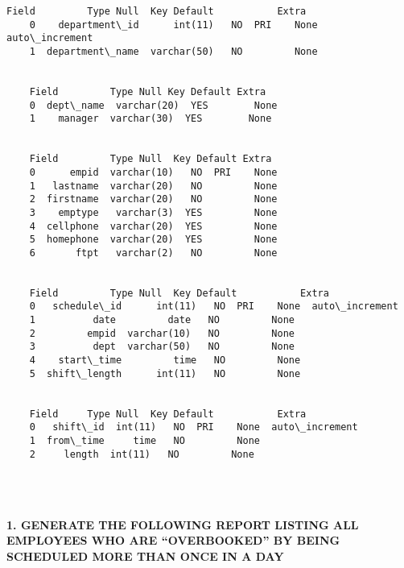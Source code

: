 \documentclass[11pt]{article}
\begin{document}
    \begin{Verbatim}[commandchars=\\\{\}]
    Field         Type Null  Key Default           Extra
    0    department\_id      int(11)   NO  PRI    None  auto\_increment
    1  department\_name  varchar(50)   NO         None                
    
    
    Field         Type Null Key Default Extra
    0  dept\_name  varchar(20)  YES        None      
    1    manager  varchar(30)  YES        None      
    
    
    Field         Type Null  Key Default Extra
    0      empid  varchar(10)   NO  PRI    None      
    1   lastname  varchar(20)   NO         None      
    2  firstname  varchar(20)   NO         None      
    3    emptype   varchar(3)  YES         None      
    4  cellphone  varchar(20)  YES         None      
    5  homephone  varchar(20)  YES         None      
    6       ftpt   varchar(2)   NO         None      
    
    
    Field         Type Null  Key Default           Extra
    0   schedule\_id      int(11)   NO  PRI    None  auto\_increment
    1          date         date   NO         None                
    2         empid  varchar(10)   NO         None                
    3          dept  varchar(50)   NO         None                
    4    start\_time         time   NO         None                
    5  shift\_length      int(11)   NO         None                
    
    
    Field     Type Null  Key Default           Extra
    0   shift\_id  int(11)   NO  PRI    None  auto\_increment
    1  from\_time     time   NO         None                
    2     length  int(11)   NO         None                
    
    
    
    \end{Verbatim}
    
    \newpage
    

    \paragraph{1. GENERATE THE FOLLOWING REPORT LISTING ALL EMPLOYEES WHO
ARE ``OVERBOOKED'' BY BEING SCHEDULED MORE THAN ONCE IN A
DAY}\label{generate-the-following-report-listing-all-employees-who-are-overbooked-by-being-scheduled-more-than-once-in-a-day}
\end{document}
